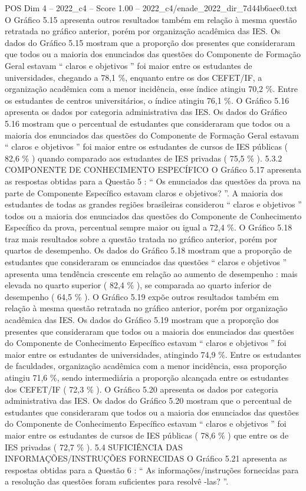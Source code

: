\begin{textsample}{POS Dim 4 – 2022\_c4 – Score 1.00 – 2022\_c4/enade\_2022\_dir\_7d44b6aec0.txt}
O Gráfico 5.15 apresenta outros resultados também em relação à mesma questão retratada no gráfico anterior, porém por organização acadêmica das IES.
Os dados do Gráfico 5.15 mostram que a proporção dos presentes que consideraram que todos ou a maioria dos enunciados das questões do Componente de Formação Geral estavam “ claros e objetivos ” foi maior entre os estudantes de universidades, chegando a 78,1 \%, enquanto entre os dos CEFET/IF, a organização acadêmica com a menor incidência, esse índice atingiu 70,2 \%.
Entre os estudantes de centros universitários, o índice atingiu 76,1 \%.
O Gráfico 5.16 apresenta os dados por categoria administrativa das IES.
Os dados do Gráfico 5.16 mostram que o percentual de estudantes que consideraram que todos ou a maioria dos enunciados das questões do Componente de Formação Geral estavam “ claros e objetivos ” foi maior entre os estudantes de cursos de IES públicas ( 82,6 \% ) quando comparado aos estudantes de IES privadas ( 75,5 \% ). 5.3.2 COMPONENTE DE CONHECIMENTO ESPECÍFICO O Gráfico 5.17 apresenta as respostas obtidas para a Questão 5 : “ Os enunciados das questões da prova na parte de Componente Específico estavam claros e objetivos? ”.
A maioria dos estudantes de todas as grandes regiões brasileiras considerou “ claros e objetivos ” todos ou a maioria dos enunciados das questões do Componente de Conhecimento Específico da prova, percentual sempre maior ou igual a 72,4 \%.
O Gráfico 5.18 traz mais resultados sobre a questão tratada no gráfico anterior, porém por quartos de desempenho.
Os dados do Gráfico 5.18 mostram que a proporção de estudantes que consideraram os enunciados das questões “ claros e objetivos ” apresenta uma tendência crescente em relação ao aumento de desempenho : mais elevada no quarto superior ( 82,4 \% ), se comparada ao quarto inferior de desempenho ( 64,5 \% ).
O Gráfico 5.19 expõe outros resultados também em relação à mesma questão retratada no gráfico anterior, porém por organização acadêmica das IES.
Os dados do Gráfico 5.19 mostram que a proporção dos presentes que consideraram que todos ou a maioria dos enunciados das questões do Componente de Conhecimento Específico estavam “ claros e objetivos ” foi maior entre os estudantes de universidades, atingindo 74,9 \%.
Entre os estudantes de faculdades, organização acadêmica com a menor incidência, essa proporção atingiu 71,6 \%, sendo intermediária a proporção alcançada entre os estudantes dos CEFET/IF ( 72,3 \% ).
O Gráfico 5.20 apresenta os dados por categoria administrativa das IES.
Os dados do Gráfico 5.20 mostram que o percentual de estudantes que consideraram que todos ou a maioria dos enunciados das questões do Componente de Conhecimento Específico estavam “ claros e objetivos ” foi maior entre os estudantes de cursos de IES públicas ( 78,6 \% ) que entre os de IES privadas ( 72,7 \% ). 5.4 SUFICIÊNCIA DAS INFORMAÇÕES/INSTRUÇÕES FORNECIDAS O Gráfico 5.21 apresenta as respostas obtidas para a Questão 6 : “ As informações/instruções fornecidas para a resolução das questões foram suficientes para resolvê -las? ”.

\end{textsample}
